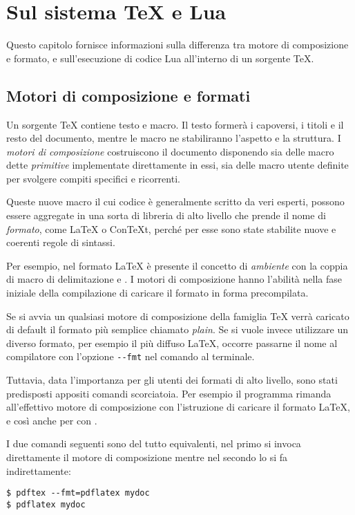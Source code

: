 

\chapter{Sul sistema \TeX{} e Lua}
\label{iichExplain}

Questo capitolo fornisce informazioni sulla differenza tra motore di
composizione e formato, e sull'esecuzione di codice Lua all'interno di un
sorgente \TeX.


\section{Motori di composizione e formati}

Un sorgente \TeX{} contiene testo e macro. Il testo formerà i capoversi, i
titoli e il resto del documento, mentre le macro ne stabiliranno l'aspetto e la
struttura. I \emph{motori di composizione} costruiscono il documento disponendo
sia delle macro dette \emph{primitive} implementate direttamente in essi, sia
delle macro utente definite per svolgere compiti specifici e ricorrenti.

Queste nuove macro il cui codice è generalmente scritto da veri esperti,
possono essere aggregate in una sorta di libreria di alto livello che prende
il nome di \emph{formato}, come \LaTeX{} o Con\TeX t, perché per esse sono
state stabilite nuove e coerenti regole di sintassi.

Per esempio, nel formato \LaTeX{} è presente il concetto di \emph{ambiente} con
la coppia di macro di delimitazione  e . I motori di
composizione hanno l'abilità nella fase iniziale della compilazione di caricare
il formato in forma precompilata.

Se si avvia un qualsiasi motore di composizione della famiglia \TeX{} verrà
caricato di default il formato più semplice chiamato \emph{plain}. Se si vuole
invece utilizzare un diverso formato, per esempio il più diffuso \LaTeX{},
occorre passarne il nome al compilatore con l'opzione \texttt{-{}-fmt} nel
comando al terminale.

Tuttavia, data l'importanza per gli utenti dei formati di alto livello, sono
stati predisposti appositi comandi scorciatoia. Per esempio il programma
 rimanda all'effettivo motore di composizione  con
l'istruzione di caricare il formato \LaTeX{}, e così anche per 
con .

I due comandi seguenti sono del tutto equivalenti, nel primo si invoca
direttamente il motore di composizione mentre nel secondo lo si fa
indirettamente:
\begin{Verbatim}[numbers=none]
$ pdftex --fmt=pdflatex mydoc
$ pdflatex mydoc
\end{Verbatim}

